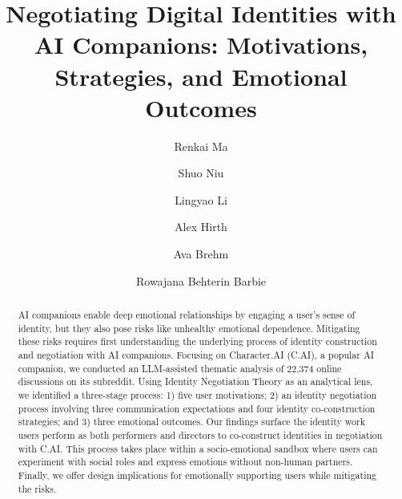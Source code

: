 \documentclass[sigconf, nonacm]{acmart}
\begin{document}
\title[Negotiating Digital Identities with AI Companions]{Negotiating Digital Identities with AI Companions: Motivations, Strategies, and Emotional Outcomes}


\author{Renkai Ma}

\author{Shuo Niu}
\authornotemark[1]

\author{Lingyao Li}

\author{Alex Hirth}

\author{Ava Brehm}

\author{Rowajana Behterin Barbie}


\renewcommand{\shortauthors}{Ma et al.}

\begin{abstract}
  AI companions enable deep emotional relationships by engaging a user's sense of identity, but they also pose risks like unhealthy emotional dependence. Mitigating these risks requires first understanding the underlying process of identity construction and negotiation with AI companions. Focusing on Character.AI (C.AI), a popular AI companion, we conducted an LLM-assisted thematic analysis of 22,374 online discussions on its subreddit. Using Identity Negotiation Theory as an analytical lens, we identified a three-stage process: 1) five user motivations; 2) an identity negotiation process involving three communication expectations and four identity co-construction strategies; and 3) three emotional outcomes. Our findings surface the identity work users perform as both performers and directors to co-construct identities in negotiation with C.AI. This process takes place within a socio-emotional sandbox where users can experiment with social roles and express emotions without non-human partners. Finally, we offer design implications for emotionally supporting users while mitigating the risks.
\end{abstract}
\end{document}

